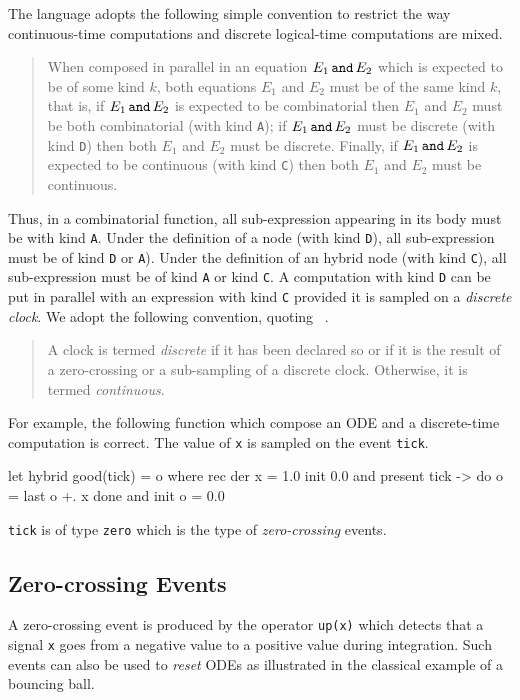 \documentclass[11pt,titlepage,twoside]{report}
\newcommand{\AndEq}[2]{{#1}\,\mbox{{\tt and}}\,{#2}}
\begin{document}
The language adopts the following simple convention to restrict the
way continuous-time computations and discrete logical-time computations
are mixed.
\begin{quote}
When composed in parallel in an equation $\AndEq{E_1}{E_2}$ which is expected to
be of some kind $k$, both
equations $E_1$ and $E_2$ must be of the same kind $k$, that is,
if $\AndEq{E_1}{E_2}$ is expected to be combinatorial then
$E_1$ and $E_2$ must be both combinatorial (with kind
\texttt{A}); if $\AndEq{E_1}{E_2}$ must be discrete (with kind \texttt{D}) then
both $E_1$ and $E_2$ must be discrete. Finally, if $\AndEq{E_1}{E_2}$ is
expected to be continuous (with
kind \texttt{C}) then both $E_1$ and $E_2$ must be continuous.
\end{quote}
Thus, in a combinatorial function, all sub-expression appearing in
its body must be with kind \texttt{A}. Under the definition of a node
(with kind \texttt{D}), all sub-expression must be of kind \texttt{D} or
\texttt{A}). Under the definition of an hybrid node (with kind
\texttt{C}), all sub-expression must be of kind \texttt{A} or kind
\texttt{C}. A computation with kind \texttt{D} can be put in parallel
with an expression with kind \texttt{C} provided it is sampled on a
\emph{discrete clock}. We adopt the following convention, quoting
~\cite{lucy:lctes11,lucy:jcss12}.
\begin{quote}
{A clock is termed \emph{discrete} if it has been declared so or if it is the 
result of a zero-crossing or a sub-sampling of a discrete clock.
Otherwise, it is termed \emph{continuous}.}
\end{quote}
For example, the following function which compose an \ac{ODE} and a 
discrete-time
computation is correct. The value of \texttt{x} is sampled
on the event \texttt{tick}.
\begin{runverbatim}[withresult]
let hybrid good(tick) = o where
  rec der x = 1.0 init 0.0
  and present tick -> do o = last o +. x done and init o = 0.0
\end{runverbatim}
\texttt{tick} is of type \texttt{zero} which is the type of
\emph{zero-crossing} events.

\subsection{Zero-crossing Events}
A zero-crossing event is produced by the operator \texttt{up(x)}
which detects that a signal \texttt{x} goes from a negative value to a
positive value during integration. Such events can also be used
to \emph{reset} \acp{ODE} as illustrated in the classical example of a 
bouncing ball.
\end{document}
